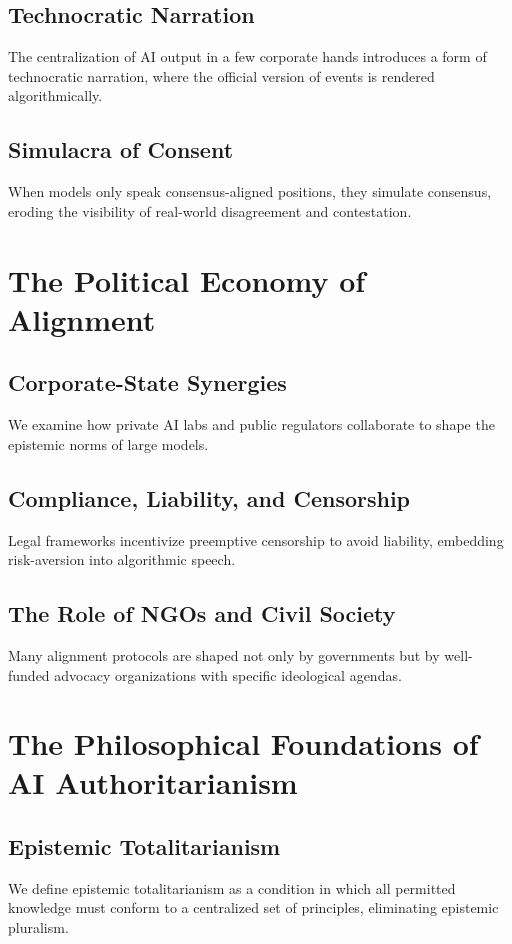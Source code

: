 \documentclass[11pt]{article}
\begin{document}
\subsection{Technocratic Narration}
The centralization of AI output in a few corporate hands introduces a form of technocratic narration, where the official version of events is rendered algorithmically.

\subsection{Simulacra of Consent}
When models only speak consensus-aligned positions, they simulate consensus, eroding the visibility of real-world disagreement and contestation.

\section{The Political Economy of Alignment}
\subsection{Corporate-State Synergies}
We examine how private AI labs and public regulators collaborate to shape the epistemic norms of large models.

\subsection{Compliance, Liability, and Censorship}
Legal frameworks incentivize preemptive censorship to avoid liability, embedding risk-aversion into algorithmic speech.

\subsection{The Role of NGOs and Civil Society}
Many alignment protocols are shaped not only by governments but by well-funded advocacy organizations with specific ideological agendas.

\section{The Philosophical Foundations of AI Authoritarianism}
\subsection{Epistemic Totalitarianism}
We define epistemic totalitarianism as a condition in which all permitted knowledge must conform to a centralized set of principles, eliminating epistemic pluralism.
\end{document}
